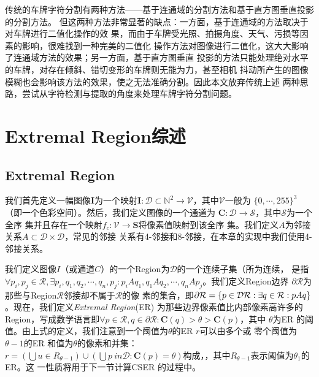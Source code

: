 传统的车牌字符分割有两种方法——基于连通域的分割方法和基于直方图垂直投影的分割方法。
但这两种方法非常显著的缺点：一方面，基于连通域的方法取决于对车牌进行二值化操作的效
果，而由于车牌受光照、拍摄角度、天气、污损等因素的影响，很难找到一种完美的二值化
操作方法对图像进行二值化，这大大影响了连通域方法的效果；另一方面，基于直方图垂直
投影的方法只能处理绝对水平的车牌，对存在倾斜、错切变形的车牌则无能为力，甚至相机
抖动所产生的图像模糊也会影响该方法的效果，使之无法准确分割。因此本文放弃传统上述
两种思路，尝试从字符检测与提取的角度来处理车牌字符分割问题。

\section{Extremal Region综述}

\subsection{Extremal Region}

我们首先定义一幅图像$\mathbf{I}$为一个映射$\mathbf{I} : \mathcal{D} \subset
\mathbb{N}^2 \rightarrow \mathcal{V}$，其中$\mathcal{V}$一般为
$\{0,\cdots,255\}^3$（即一个色彩空间）。然后，我们定义图像的一个通道为
$\mathbf{C} : \mathcal{D} \rightarrow \mathcal{S}$，其中$\mathcal{S}$为一个全序
集并且存在一个映射$f_c : \mathcal{V} \rightarrow \mathbf{S}$将像素值映射到该全序
集。我们定义$A$为邻接关系$A \subset \mathcal{D} \times \mathcal{D}$，常见的邻接
关系有4-邻接和8-邻接，在本章的实现中我们使用4-邻接关系。

我们定义图像$I$（或通道$C$）的一个Region为$\mathcal{D}$的一个连续子集（所为连续，
是指$\forall{p_i, p_j \in \mathcal{R}}, \exists{p_i, q_1, q_2, \cdots, q_n,
  p_j} : p_iAq_1, q_1Aq_2,\cdots,q_nAp_j$。我们定义Region边界
$\partial{\mathcal{R}}$为那些与Region$\mathcal{R}$邻接却不属于$\mathcal{R}$的像
素的集合，即$\partial{\mathcal{R}} = \{p \in \mathcal{D} \\ \mathcal{R} :
\exists{q \in \mathcal{R}} : pAq \}$。现在，我们定义\textit{Extremal Region}(ER)
为那些边界像素值比内部像素高许多的Region，写成数学语言即$\forall{p \in
  \mathcal{R}}, q \in \partial{\mathcal{R}} : \mathbf{C}(q) > \theta > \mathbf{C}(p)$，其中
$\theta$为ER 的阈值。由上式的定义，我们注意到一个阈值为$\theta$的ER $r$可以由多个或
零个阈值为$\theta - 1$的ER 和值为$\theta$的像素和并集：$r = \left( \bigcup{u \in
    R_{\theta-1}} \right) \cup \left( \bigcup{p \ in \mathcal{D} : \mathbf{C}(p)
  = \theta} \right)$构成，，其中\(R_{\theta-1}\)表示阈值为\(\theta_1\)的 ER。这
一性质将用于下一节计算CSER 的过程中。

